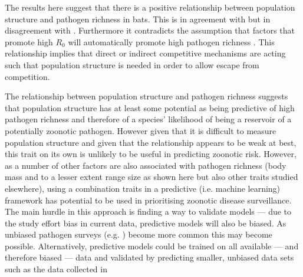 
The results here suggest that there is a positive relationship between population structure and pathogen richness in bats.
This is in agreement with \cite{maganga2014bat, turmelle2009correlates} but in disagreement with \cite{gay2014parasite}.
Furthermore it contradicts the assumption that factors that promote high $R_0$ will automatically promote high pathogen richness \cite{nunn2003comparative, morand2000wormy}.
This relationship implies that direct or indirect competitive mechanisms are acting such that population structure is needed in order to allow escape from competition.

The relationship between population structure and pathogen richness suggests that population structure has at least some potential as being predictive of high pathogen richness and therefore of a species' likelihood of being a reservoir of a potentially zoonotic pathogen. 
However given that it is difficult to measure population structure and given that the relationship appears to be weak at best, this trait on its own is unlikely to be useful in predicting zoonotic risk.
However, as a number of other factors are also associated with pathogen richness (body mass and to a lesser extent range size as shown here but also other traits studied elsewhere), using a combination traits in a predictive (i.e. machine learning) framework has potential to be used in prioritising zoonotic disease surveillance.
The main hurdle in this approach is finding a way to validate models --- due to the study effort bias in current data, predictive models will also be biased.
As unbiased pathogen surveys (e.g. \textcite{anthony2013strategy}) become more common this may become possible.
Alternatively, predictive models could be trained on all available --- and therefore biased --- data and validated by predicting smaller, unbiased data sets such as the data collected in \textcite{maganga2014bat}

